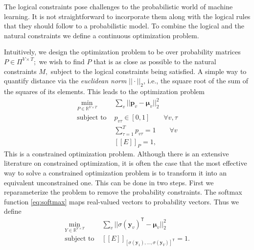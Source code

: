 \documentclass[sigplan,10pt,review,anonymous]{acmart}
\newcommand{\qqpi}[2]{[\![#2]\!]_{#1}}
\theoremstyle{plain}
\theoremstyle{remark}
\theoremstyle{definition}
\begin{document}
The logical constraints pose challenges to the probabilistic world of
machine learning. It is not straightforward to incorporate them along with 
the logical rules that they should follow to a probabilistic model. To combine the logical and the natural constraints we define a continuous 
optimization problem.

\noindent {}

Intuitively, we design the optimization problem to be over
probability matrices $P \in \Pi^{V \times T};$ we wish to find
$P$ that is as close as possible to the natural constraints $M,$
subject to the logical constraints being satisfied. A simple
way to quantify
distance via the \emph{euclidean norm} $|| \cdot ||_2$, i.e., the square root of the sum of the squares of its elements.
 This leads to the optimization problem
\begin{equation}
\begin{aligned}\label{eq:opt_naive}
 \underset{P \in \mathbb{R}^{V \times T}}{\mathrm{min}} &
    \sum_v || \bm{p}_v - \bm{\mu}_v ||_2^2 \\
 \text{subject to } & p_{v\tau} \in [0, 1] \qquad \forall v, \tau \\
 &\sum_{\tau=1}^T p_{v\tau} = 1 \qquad \forall v \\
  & \qqpi{P}{E} = 1,
\end{aligned}
\end{equation}
This is a constrained optimization problem. Although there is an extensive
literature on constrained optimization, it is often the case
that the most effective way to solve a constrained optimization
problem is to transform it into an equivalent unconstrained one.
This can be done in two steps. First we reparameterize the problem 
to remove the probability constraints. The softmax function \eqref{eq:softmax} maps real-valued vectors to probability vectors.
Thus we define 
\begin{equation}
\begin{aligned}\label{eq:opt_no_prob}
 \underset{Y \in \mathbb{R}^{V \times T}}{\mathrm{min}} &
    \sum_v || \sigma(\bm{y}_v)^\mathsf{T} - \bm{\mu}_v ||_2^2 \\
 \text{subject to } & \qqpi{[\sigma(\bm{y}_1), \ldots, \sigma(\bm{y}_{V})]^\mathsf{T}}{E} = 1.
\end{aligned}
\end{equation}
\end{document}
